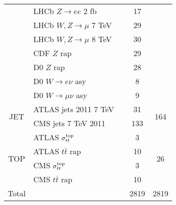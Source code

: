 \begin{center}
\begin{tabular}{|c|l|c|c|c|}
& LHCb $Z \to ee$ 2 fb   & \cite{Aaij:2012mda}    & 17  &      \\
& LHCb $W, Z \to \mu$ 7 TeV  &  \cite{Aaij:2015gna}    & 29  &   \\
& LHCb $W, Z \to \mu$ 8 TeV &  \cite{Aaij:2015zlq}     & 30  &      \\
& CDF $Z$ rap    &  \cite{Aaltonen:2010zza}       & 29   &     \\
& D0 $Z$ rap    &  \cite{Abazov:2007jy}        & 28  &     \\
& D0 $W\to e\nu$ asy  & \cite{D0:2014kma}         & 8  &     \\
& D0 $W\to\mu\nu$ asy     &  \cite{Abazov:2013rja}        &  9 &   \\
\midrule
\multirow{2}{*}{JET}   & ATLAS jets 2011 7 TeV    & \cite{Aad:2011fc}  &  31 &  \multirow{2}{*}{164}    \\
& CMS jets 7 TeV 2011       & \cite{Chatrchyan:2012bja}  &  133  &  \\
\midrule
\multirow{4}{*}{TOP}     &
ATLAS $\sigma_{tt}^{\rm top}$       & \cite{Aad:2014kva, Aaboud:2016pbd}  & 3  & \multirow{4}{*}{26}  \\
& ATLAS $t\bar{t}$ rap &  \cite{Aad:2015mbv} & 10   &\\
& CMS $\sigma_{tt}^{\rm top}$   & \cite{Khachatryan:2016mqs, Khachatryan:2015uqb}       &  3 &   \\
& CMS $t\bar{t}$ rap   & \cite{Khachatryan:2015oqa}& 10   &   \\
\bottomrule
Total    &         &        & 2819  &  2819  \\
\bottomrule
\end{tabular}
\end{center}
